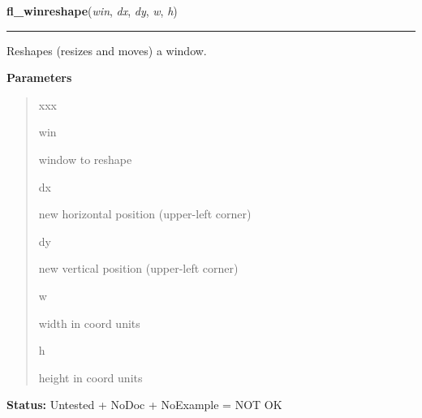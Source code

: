 \hspace{.8\funcindent}\begin{boxedminipage}{\funcwidth}

    \raggedright \textbf{fl\_winreshape}(\textit{win}, \textit{dx}, \textit{dy}, \textit{w}, \textit{h})

    \vspace{-1.5ex}

    \rule{\textwidth}{0.5\fboxrule}
\setlength{\parskip}{2ex}
    Reshapes (resizes and moves) a window.

\setlength{\parskip}{1ex}
      \textbf{Parameters}
      \vspace{-1ex}

      \begin{quote}
        \begin{Ventry}{xxx}

          \item[win]

          window to reshape

          \item[dx]

          new horizontal position (upper-left corner)

          \item[dy]

          new vertical position (upper-left corner)

          \item[w]

          width in coord units

          \item[h]

          height in coord units

        \end{Ventry}

      \end{quote}

\textbf{Status:} Untested + NoDoc + NoExample = NOT OK



    \end{boxedminipage}

    \label{xformslib:library:fl_winicon}

    \vspace{0.5ex}

